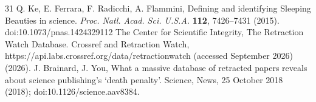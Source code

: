 \begin{thebibliography}{31}
 Q. Ke, E. Ferrara, F. Radicchi, A. Flammini, Defining and identifying Sleeping Beauties in science. \textit{Proc. Natl. Acad. Sci. U.S.A.} \textbf{112}, 7426–7431 (2015). doi:10.1073/pnas.1424329112
 The Center for Scientific Integrity, The Retraction Watch Database. Crossref and Retraction Watch, https://api.labs.crossref.org/data/retractionwatch (accessed September 2026) (2026).
 J. Brainard, J. You, What a massive database of retracted papers reveals about science publishing's `death penalty'. Science, News, 25 October 2018 (2018); doi:10.1126/science.aav8384.
\end{thebibliography}
